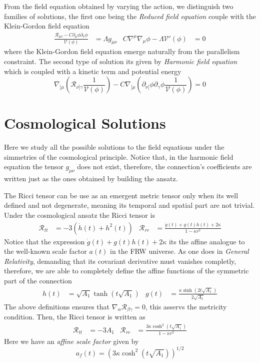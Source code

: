 \documentclass[10pt,a4paper]{article}
\begin{document}
From the field equation obtained by varying the action, we distinguish two families of solutions, the first one being the
\textit{Reduced field equation} couple with the Klein-Gordon field equation
\begin{align}
  \frac{\mathcal{R}_{\mu\nu} - C\partial_\mu \phi \partial_\nu \phi}{\mathcal{V}(\phi)} & = \Lambda g_{\mu\nu} & 
  C \nabla^\mu \nabla_\mu \phi - \Lambda \mathcal{V}'(\phi) & = 0
\end{align}
where the Klein-Gordon field equation emerge naturally from the parallelism constraint. The second type of solution its given by
\textit{Harmonic field equation} which is coupled with a kinetic term and potential energy
\begin{equation}
  \nabla_{[\mu}\left(\mathcal{R}_{\nu]\gamma}\frac{1}{\mathcal{V}(\phi)}\right) 
  - C \nabla_{[\mu}\left(\partial_{\nu]} \phi \partial_\gamma \phi \frac{1}{\mathcal{V}(\phi)}\right) = 0
\end{equation}





\section{Cosmological Solutions}

Here we study all the possible solutions to the field equations under the simmetries of the cosmological principle. Notice that, in the harmonic 
field equation the tensor $g_{\mu\nu}$ does not exist, therefore, the connection's coefficients are written just as the ones
obtained by building the ansatz.

The Ricci tensor can be use as an emergent metric tensor only when its well defined and not degenerate, meaning its temporal and spatial
part are not trivial. Under the cosmological ansatz the Ricci tensor is 
\begin{align}
  \mathcal{R}_{tt} & = -3\left(\dot{h}(t) + h^2(t)\right) & \mathcal{R}_{rr} & = \frac{\dot{g}(t) + g(t)h(t) + 2\kappa}{1 - \kappa r^2}
\end{align}
Notice that the expression $\dot{g}(t) + g(t)h(t) + 2\kappa$ its the affine analogue to the well-known scale factor $a(t)$ in the FRW universe. As 
one does in \textit{General Relativity}, demanding that its covariant derivative must vanishes completly, therefore, we are able 
to completely define the affine functions of the symmetric part of the connection
\begin{align}
  h(t) & = \sqrt{A_1}\tanh\left(t\sqrt{A_1}\right) & g(t) & = \frac{\kappa \sinh\left(2t\sqrt{A_1}\right) }{2\sqrt{A_1}}
\end{align}
The above definitions ensures that $\nabla_\alpha \mathcal{R}_{\beta\gamma} = 0$, this asservs the metricity condition. Then, the Ricci tensor
is written as
\begin{align}
  \mathcal{R}_{tt} & = -3A_1 & \mathcal{R}_{rr} & =  \frac{3\kappa \cosh^2(t\sqrt{A_1})}{1 - \kappa r^2}
\end{align}
Here we have an \textit{affine scale factor} given by 
\begin{equation}
  a_f(t) = \left(3\kappa \cosh^2(t\sqrt{A_1})\right)^{1/2}
\end{equation}
\end{document}
